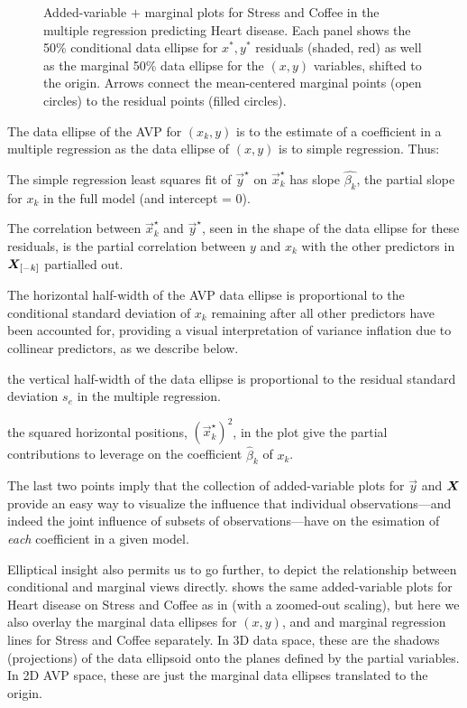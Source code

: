 \begin{figure}[htb]
\begin{minipage}[b]{.49\linewidth}
 \end{minipage}
  \caption{Added-variable $+$ marginal plots for Stress and Coffee in the multiple regression predicting Heart disease.
Each panel shows the 50\% conditional data ellipse for $x^{*}, y^{*}$ residuals (shaded, red) as well as the marginal 50\%
data ellipse for the $(x, y)$ variables, shifted to the origin.
Arrows connect the mean-centered marginal points (open circles) to the residual points (filled circles).}
  \label{fig:coffee-avplot-B}
\end{figure}

\begin{itemize*}
 \item The data ellipse of the AVP for $(x_k, y)$ is to the estimate of a coefficient in a multiple regression as
 the data ellipse of $(x, y)$ is to simple regression. Thus:
 \item The simple regression least squares fit of $\vec{y}^\star$ on $\vec{x}_k^\star$ has slope $\hat{\beta_k}$,
 the partial slope for $x_k$ in the full model (and intercept = 0).
 \item The correlation between $\vec{x}_k^\star$ and $\vec{y}^\star$, seen in the shape of the data ellipse for these residuals,
 is the partial correlation between $y$ and $x_k$ with the other predictors in $\bm{X}_{[-k]}$ partialled out.
 \item The horizontal half-width of the AVP data ellipse is proportional to the conditional standard deviation of
 $x_k$ remaining after all other predictors have been accounted for, providing a visual interpretation
 of variance inflation due to collinear predictors, as we describe below.
 \item the vertical half-width of the data ellipse is proportional to the residual standard deviation $s_e$ in the multiple regression.
 \item the squared horizontal positions, $(\vec{x}_k^\star)^2$, in the plot give the partial contributions
 to leverage on the coefficient $\hat{\beta}_k$ of $x_k$.
 \item The last two points imply that the collection of added-variable plots for $\vec{y}$ and
 $\bm{X}$ provide an easy way to visualize the influence that individual observations---and indeed the joint influence of subsets of observations---have on
 the esimation of \emph{each} coefficient in a given model.
\end{itemize*}


Elliptical insight also permits us to go further, to depict the relationship between conditional and marginal views
directly.
 shows the same added-variable plots for Heart disease on Stress and Coffee
as in  (with a zoomed-out scaling), but here we also overlay the
marginal data ellipses for $(x, y)$,
and and marginal regression lines for Stress and Coffee separately.  In 3D data space,
these are the shadows (projections) of the data ellipsoid onto the planes defined by the
partial variables.  In 2D AVP space, these are just the marginal data ellipses translated to
the origin.

